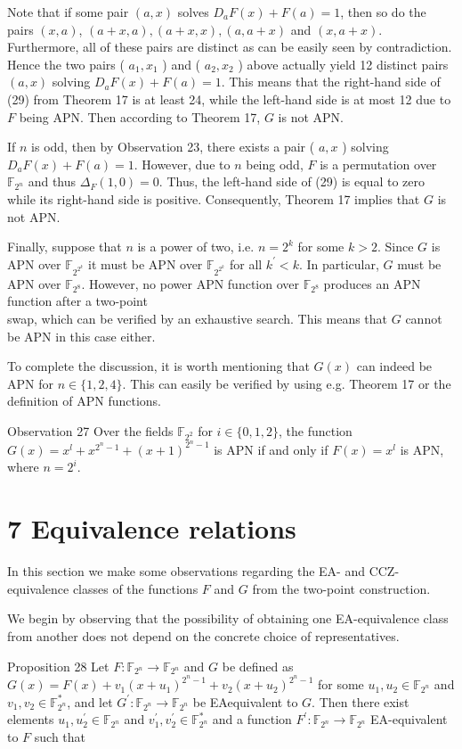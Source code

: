 \documentclass[10pt]{article}
\begin{document}
Note that if some pair $(a, x)$ solves $D_{a} F(x)+F(a)=1$, then so do the pairs $(x, a)$, $(a+x, a),(a+x, x),(a, a+x)$ and $(x, a+x)$. Furthermore, all of these pairs are distinct as can be easily seen by contradiction. Hence the two pairs ( $a_{1}, x_{1}$ ) and ( $a_{2}, x_{2}$ ) above actually yield 12 distinct pairs $(a, x)$ solving $D_{a} F(x)+F(a)=1$. This means that the right-hand side of (29) from Theorem 17 is at least 24, while the left-hand side is at most 12 due to $F$ being APN. Then according to Theorem 17, $G$ is not APN.

If $n$ is odd, then by Observation 23, there exists a pair ( $a, x$ ) solving $D_{a} F(x)+F(a)=1$. However, due to $n$ being odd, $F$ is a permutation over $\mathbb{F}_{2^{n}}$ and thus $\Delta_{F}(1,0)=0$. Thus, the left-hand side of (29) is equal to zero while its right-hand side is positive. Consequently, Theorem 17 implies that $G$ is not APN.

Finally, suppose that $n$ is a power of two, i.e. $n=2^{k}$ for some $k>2$. Since $G$ is APN over $\mathbb{F}_{2^{2^{k}}}$ it must be APN over $\mathbb{F}_{2^{2^{k}}}$ for all $k^{\prime}<k$. In particular, $G$ must be APN over $\mathbb{F}_{2^{8}}$. However, no power APN function over $\mathbb{F}_{2^{8}}$ produces an APN function after a two-point\\
swap, which can be verified by an exhaustive search. This means that $G$ cannot be APN in this case either.

To complete the discussion, it is worth mentioning that $G(x)$ can indeed be APN for $n \in\{1,2,4\}$. This can easily be verified by using e.g. Theorem 17 or the definition of APN functions.

Observation 27 Over the fields $\mathbb{F}_{2^{2}}$ for $i \in\{0,1,2\}$, the function $G(x)=x^{l}+x^{2^{n}-1}+ (x+1)^{2^{n}-1}$ is APN if and only if $F(x)=x^{l}$ is APN, where $n=2^{i}$.

\section*{7 Equivalence relations}
In this section we make some observations regarding the EA- and CCZ-equivalence classes of the functions $F$ and $G$ from the two-point construction.

We begin by observing that the possibility of obtaining one EA-equivalence class from another does not depend on the concrete choice of representatives.

Proposition 28 Let $F: \mathbb{F}_{2^{n}} \rightarrow \mathbb{F}_{2^{n}}$ and $G$ be defined as $G(x)=F(x)+v_{1}\left(x+u_{1}\right)^{2^{n}-1}+ v_{2}\left(x+u_{2}\right)^{2^{n}-1}$ for some $u_{1}, u_{2} \in \mathbb{F}_{2^{n}}$ and $v_{1}, v_{2} \in \mathbb{F}_{2^{n}}^{*}$, and let $G^{\prime}: \mathbb{F}_{2^{n}} \rightarrow \mathbb{F}_{2^{n}}$ be EAequivalent to $G$. Then there exist elements $u_{1}, u_{2}^{\prime} \in \mathbb{F}_{2^{n}}$ and $v_{1}^{\prime}, v_{2}^{\prime} \in \mathbb{F}_{2^{n}}^{*}$ and a function $F^{\prime}: \mathbb{F}_{2^{n}} \rightarrow \mathbb{F}_{2^{n}}$ EA-equivalent to $F$ such that
\end{document}
